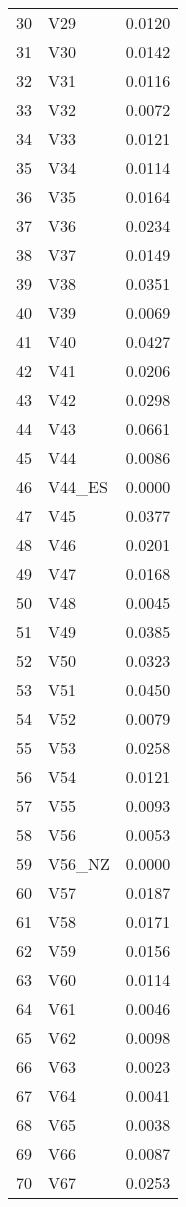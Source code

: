 \documentclass{amsart}
\begin{document}
\begin{longtable}{rlr}
  30 & V29 & 0.0120 \\ 
  31 & V30 & 0.0142 \\ 
  32 & V31 & 0.0116 \\ 
  33 & V32 & 0.0072 \\ 
  34 & V33 & 0.0121 \\ 
  35 & V34 & 0.0114 \\ 
  36 & V35 & 0.0164 \\ 
  37 & V36 & 0.0234 \\ 
  38 & V37 & 0.0149 \\ 
  39 & V38 & 0.0351 \\ 
  40 & V39 & 0.0069 \\ 
  41 & V40 & 0.0427 \\ 
  42 & V41 & 0.0206 \\ 
  43 & V42 & 0.0298 \\ 
  44 & V43 & 0.0661 \\ 
  45 & V44 & 0.0086 \\ 
  46 & V44\_ES & 0.0000 \\ 
  47 & V45 & 0.0377 \\ 
  48 & V46 & 0.0201 \\ 
  49 & V47 & 0.0168 \\ 
  50 & V48 & 0.0045 \\ 
  51 & V49 & 0.0385 \\ 
  52 & V50 & 0.0323 \\ 
  53 & V51 & 0.0450 \\ 
  54 & V52 & 0.0079 \\ 
  55 & V53 & 0.0258 \\ 
  56 & V54 & 0.0121 \\ 
  57 & V55 & 0.0093 \\ 
  58 & V56 & 0.0053 \\ 
  59 & V56\_NZ & 0.0000 \\ 
  60 & V57 & 0.0187 \\ 
  61 & V58 & 0.0171 \\ 
  62 & V59 & 0.0156 \\ 
  63 & V60 & 0.0114 \\ 
  64 & V61 & 0.0046 \\ 
  65 & V62 & 0.0098 \\ 
  66 & V63 & 0.0023 \\ 
  67 & V64 & 0.0041 \\ 
  68 & V65 & 0.0038 \\ 
  69 & V66 & 0.0087 \\ 
  70 & V67 & 0.0253 \\ 

\end{longtable}
\end{document}
